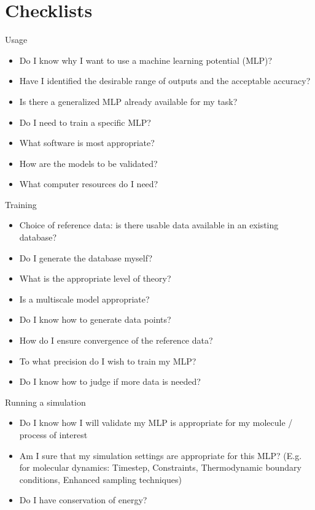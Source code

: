 \documentclass[9pt,bestpractices]{livecoms}
\begin{document}
\section{Checklists}

\begin{Checklists*}[p!]

\begin{checklist}{Usage}
\begin{itemize}
\item Do I know why I want to use a machine learning potential (MLP)?
\item Have I identified the desirable range of outputs and the acceptable accuracy?
\item Is there a generalized MLP already available for my task?
\item Do I need to train a specific MLP?
\item What software is most appropriate?
\item How are the models to be validated?
\item What computer resources do I need?
\end{itemize}
\end{checklist}

\begin{checklist}{Training}
\begin{itemize}
\item Choice of reference data: is there usable data available in an existing
database?
\item Do I generate the database myself?
\item What is the appropriate level of theory?
\item Is a multiscale model appropriate?
\item Do I know how to generate data points?
\item How do I ensure convergence of the reference data?
\item To what precision do I wish to train my MLP?
\item Do I know how to judge if more data is needed?
\end{itemize}
\end{checklist}

\begin{checklist}{Running a simulation}
\begin{itemize}
\item Do I know how I will validate my MLP is appropriate for my molecule /
process of interest
\item Am I sure that my simulation settings are appropriate for this MLP? (E.g.
for molecular dynamics: Timestep, Constraints, Thermodynamic boundary
conditions, Enhanced sampling techniques)
\item Do I have conservation of energy?
\end{itemize}
\end{checklist}


\end{Checklists*}
\end{document}
